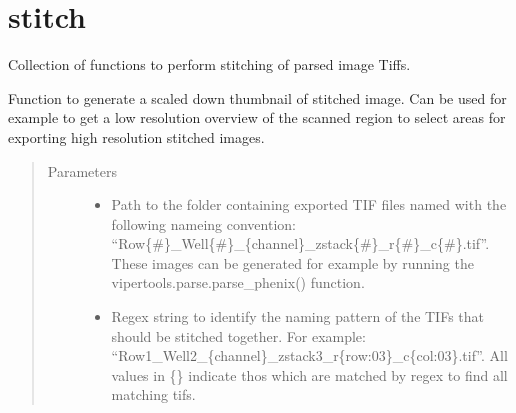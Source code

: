 \documentclass[a4paper,10pt,english,openany,oneside]{sphinxmanual}
\begin{document}
\label{\detokenize{index:module-vipertools.stitch}}

\chapter{stitch}
\label{\detokenize{index:stitch}}
\sphinxAtStartPar
Collection of functions to perform stitching of parsed image Tiffs.

\begin{fulllineitems}
\label{\detokenize{index:vipertools.stitch.generate_stitched}}
\sphinxAtStartPar
Function to generate a scaled down thumbnail of stitched image. Can be used for example to
get a low resolution overview of the scanned region to select areas for exporting high resolution
stitched images.
\begin{quote}\begin{description}
\item[{Parameters}] \leavevmode\begin{itemize}
\item {} 
\sphinxAtStartPar
{} \textendash{} Path to the folder containing exported TIF files named with the following nameing convention: “Row\{\#\}\_Well\{\#\}\_\{channel\}\_zstack\{\#\}\_r\{\#\}\_c\{\#\}.tif”.
These images can be generated for example by running the vipertools.parse.parse\_phenix() function.

\item {} 
\sphinxAtStartPar
{} \textendash{} Regex string to identify the naming pattern of the TIFs that should be stitched together.
For example: “Row1\_Well2\_\{channel\}\_zstack3\_r\{row:03\}\_c\{col:03\}.tif”.
All values in \{\} indicate thos which are matched by regex to find all matching tifs.


\end{itemize}
\end{description}
\end{quote}
\end{fulllineitems}
\end{document}
